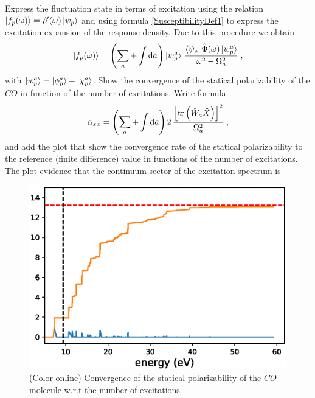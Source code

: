 \documentclass[reprint,aps,prb]{revtex4-1}
\newcommand{\dd}{{\rm d}}
\newcommand{\be}{\begin{equation}}
\newcommand{\ee}{\end{equation}}
\newcommand{\lb}{\label}
\newcommand{\op}[1]{\hat {#1}}
\newcommand{\trace}[1]{\mathrm{tr}\left(#1\right)}
\newcommand{\dm}{\op{\rho}}
\begin{document}
Express the fluctuation state in terms of excitation using the relation $\ket{f_p(\omega)} = \dm'(\omega)\ket{\psi_p}$ and using formula \eqref{SusceptibilityDef1} to express the excitation
expansion of the response density. Due to this procedure we obtain
\be\lb{FSExcitationDef1}
\ket{f_p(\omega)}   = \left(\sum_a + \int\dd a   \right) \ket{w_p^a} \,
\frac{\bra{\psi_p}\op\Phi(\omega)\ket{w_p^a}}{\omega^2-\Omega_a^2} \;,
\ee 
with $\ket{w_p^a}=\ket{\phi_p^a}+\ket{\chi_p^a}$. 
Show the convergence of the statical polarizability of the $CO$ in function of the number of excitations. Write formula
\be\lb{AlphaExcitationDef1}
\alpha_{xx} =  \left(\sum_a + \int\dd a   \right) 2 \,
\frac{\left[\trace{\op W_a \op X}\right]^2}{\Omega_a^2} \;,
\ee 
and add the plot that show the convergence rate of the statical polarizability to the reference (finite difference) value in functions of the number of excitations. The plot evidence that the
continuum sector of the excitation spectrum is 
\begin{figure}
\includegraphics[scale=0.56]{CO_alphaX_isto.eps}
\caption{\label{co_AlphaExc}(Color online) Convergence of the statical polarizability of the $CO$ molecule w.r.t the number of excitations.}
\end{figure}
\end{document}
